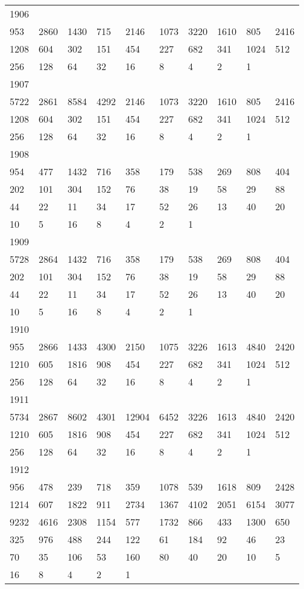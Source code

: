 \begin{longtable}{*{10}{l}}
1906&&&&&&&&&\\
953& 2860& 1430& 715& 2146& 1073& 3220& 1610& 805& 2416\\
1208& 604& 302& 151& 454& 227& 682& 341& 1024& 512\\
256& 128& 64& 32& 16& 8& 4& 2& 1& \\

1907&&&&&&&&&\\
5722& 2861& 8584& 4292& 2146& 1073& 3220& 1610& 805& 2416\\
1208& 604& 302& 151& 454& 227& 682& 341& 1024& 512\\
256& 128& 64& 32& 16& 8& 4& 2& 1& \\

1908&&&&&&&&&\\
954& 477& 1432& 716& 358& 179& 538& 269& 808& 404\\
202& 101& 304& 152& 76& 38& 19& 58& 29& 88\\
44& 22& 11& 34& 17& 52& 26& 13& 40& 20\\
10& 5& 16& 8& 4& 2& 1& \\

1909&&&&&&&&&\\
5728& 2864& 1432& 716& 358& 179& 538& 269& 808& 404\\
202& 101& 304& 152& 76& 38& 19& 58& 29& 88\\
44& 22& 11& 34& 17& 52& 26& 13& 40& 20\\
10& 5& 16& 8& 4& 2& 1& \\

1910&&&&&&&&&\\
955& 2866& 1433& 4300& 2150& 1075& 3226& 1613& 4840& 2420\\
1210& 605& 1816& 908& 454& 227& 682& 341& 1024& 512\\
256& 128& 64& 32& 16& 8& 4& 2& 1& \\

1911&&&&&&&&&\\
5734& 2867& 8602& 4301& 12904& 6452& 3226& 1613& 4840& 2420\\
1210& 605& 1816& 908& 454& 227& 682& 341& 1024& 512\\
256& 128& 64& 32& 16& 8& 4& 2& 1& \\

1912&&&&&&&&&\\
956& 478& 239& 718& 359& 1078& 539& 1618& 809& 2428\\
1214& 607& 1822& 911& 2734& 1367& 4102& 2051& 6154& 3077\\
9232& 4616& 2308& 1154& 577& 1732& 866& 433& 1300& 650\\
325& 976& 488& 244& 122& 61& 184& 92& 46& 23\\
70& 35& 106& 53& 160& 80& 40& 20& 10& 5\\
16& 8& 4& 2& 1& \\


\end{longtable}
